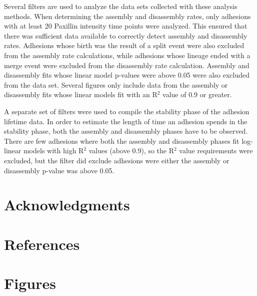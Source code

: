 \documentclass[10pt]{article}
\begin{document}
Several filters are used to analyze the data sets collected with these analysis
methods. When determining the assembly and disassembly rates, only adhesions
with at least 20 Paxillin intensity time points were analyzed. This ensured that
there was sufficient data available to correctly detect assembly and disassembly
rates. Adhesions whose birth was the result of a split event were also excluded
from the assembly rate calculations, while adhesions whose lineage ended with a
merge event were excluded from the disassembly rate calculation. Assembly and
disassembly fits whose linear model p-values were above 0.05 were also excluded
from the data set. Several figures only include data from the assembly or
disassembly fits whose linear models fit with an R$^2$ value of 0.9 or greater.

A separate set of filters were used to compile the stability phase of the
adhesion lifetime data. In order to estimate the length of time an adhesion
spends in the stability phase, both the assembly and disassembly phases have to
be observed. There are few adhesions where both the assembly and disassembly
phases fit log-linear models with high R$^2$ values (above 0.9), so the
R$^2$ value requirements were excluded, but the filter did exclude adhesions
were either the assembly or disassembly p-value was above 0.05.

\section*{Acknowledgments}

\section*{References}


\section*{Figures}
\end{document}
